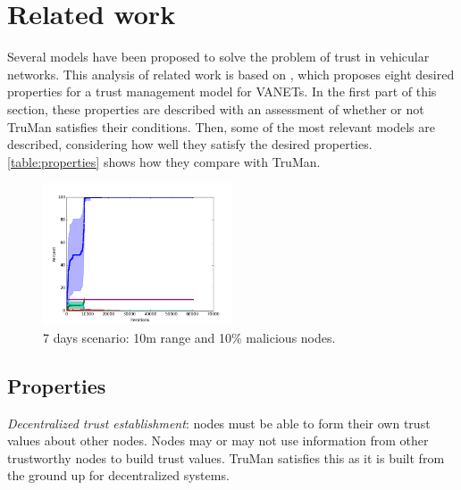 \documentclass[conference]{IEEEtran}
\begin{document}




\section{Related work}
\label{section:previouswork}

Several models have been proposed to solve the problem of trust in vehicular networks. 
This analysis of related work is based on \cite{zhang2011survey}, which proposes eight desired properties for a trust management model for VANETs.
In the first part of this section, these properties are described with an assessment of whether or not TruMan satisfies their conditions.
Then, some of the most relevant models are described, considering how well they satisfy the desired properties.
\autoref{table:properties} shows how they compare with TruMan.

\begin{figure}
\centering
\includegraphics[width=0.5\textwidth]{Network_rA7/10_10}
\caption{7 days scenario: 10m range and 10\% malicious nodes.} \label{fig:random7}
\end{figure}

\subsection{Properties}
\label{section:properties}

\textit{Decentralized trust establishment}: nodes must be able to form their own trust values about other nodes.
Nodes may or may not use information from other trustworthy nodes to build trust values.
TruMan satisfies this as it is built from the ground up for decentralized systems.
\end{document}
